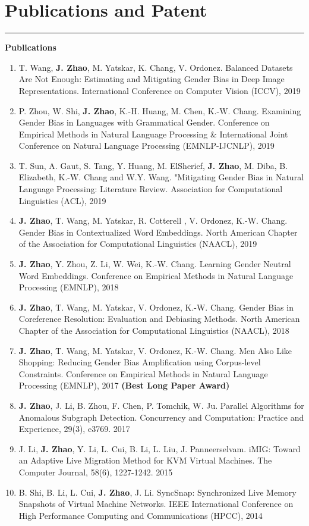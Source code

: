 \documentclass[11pt, a4paper]{article}
\newcommand{\hr}{\hrule\vspace{0.5em}}
\begin{document}
\section*{Publications and Patent}
\hr
\hspace{0.32in}\textbf{Publications}
\begin{enumerate}
	\item T. Wang, \textbf{J. Zhao},  M. Yatskar, K. Chang, V. Ordonez. Balanced Datasets Are Not Enough: Estimating and Mitigating Gender Bias in Deep Image Representations. International Conference on Computer Vision (ICCV), 2019
	\item P. Zhou, W. Shi, \textbf{J. Zhao}, K.-H. Huang, M. Chen, K.-W. Chang. Examining Gender Bias in Languages with Grammatical Gender. Conference on Empirical Methods in Natural Language Processing \& International Joint Conference on Natural Language Processing (EMNLP-IJCNLP), 2019
	\item T. Sun, A. Gaut, S. Tang, Y. Huang, M. ElSherief, \textbf{J. Zhao}, M. Diba, B. Elizabeth, K.-W. Chang and W.Y. Wang. "Mitigating Gender Bias in Natural Language Processing: Literature Review. Association for Computational Linguistics (ACL), 2019
	\item \textbf{J. Zhao}, T. Wang, M. Yatskar, R. Cotterell , V. Ordonez, K.-W. Chang. Gender Bias in Contextualized Word Embeddings. North American Chapter of the Association for Computational Linguistics (NAACL), 2019
	\item \textbf{J. Zhao}, Y. Zhou, Z. Li, W. Wei, K.-W. Chang. Learning Gender Neutral Word Embeddings. Conference on Empirical Methods in Natural Language Processing (EMNLP), 2018
	\item \textbf{J. Zhao}, T. Wang, M. Yatskar, V. Ordonez, K.-W. Chang. Gender Bias in Coreference Resolution: Evaluation and Debiasing Methods. North American Chapter of the Association for Computational Linguistics (NAACL), 2018
	\item \textbf{J. Zhao}, T. Wang, M. Yatskar, V. Ordonez, K.-W. Chang. Men Also Like Shopping: Reducing Gender Bias Amplification using Corpus-level Constraints. Conference on Empirical Methods in Natural Language Processing (EMNLP), 2017 {\color{red}\textbf{(Best Long Paper Award)}}
	\item \textbf{J. Zhao}, J. Li, B. Zhou, F. Chen, P. Tomchik, W. Ju. Parallel Algorithms for Anomalous Subgraph Detection. Concurrency and Computation: Practice and Experience, 29(3), e3769. 2017
	\item J. Li, \textbf{J. Zhao}, Y. Li, L. Cui, B. Li, L. Liu, J. Panneerselvam. iMIG: Toward an Adaptive Live Migration Method for KVM Virtual Machines. The Computer Journal, 58(6), 1227-1242. 2015
	\item B. Shi, B. Li, L. Cui, \textbf{J. Zhao}, J. Li. SyncSnap: Synchronized Live Memory Snapshots of Virtual Machine Networks. IEEE International Conference on High Performance Computing and Communications (HPCC), 2014
\end{enumerate}
\end{document}
